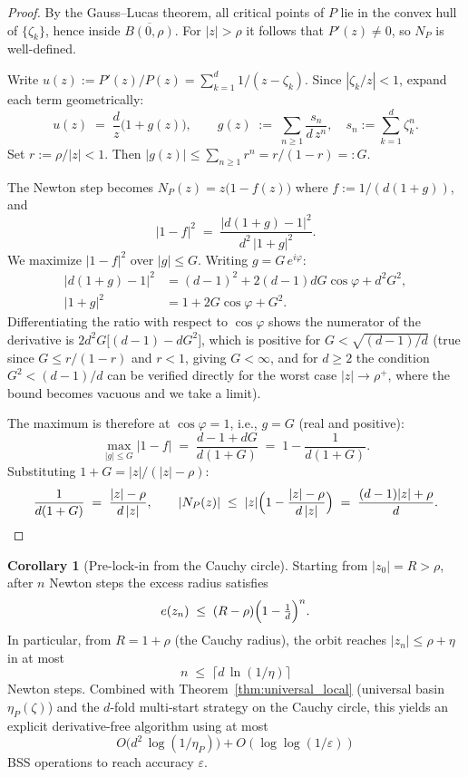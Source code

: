 \documentclass[11pt,a4paper]{article}
\theoremstyle{definition}
\newtheorem{corollary}{Corollary}[section]
\begin{document}
\begin{proof}
By the Gauss--Lucas theorem, all critical points of $P$ lie in the convex hull of $\{\zeta_k\}$, hence inside $\overline{B(0, \rho)}$.  For $|z| > \rho$ it follows that $P'(z) \neq 0$, so $N_P$ is well-defined.

Write $u(z) := P'(z)/P(z) = \sum_{k=1}^d 1/(z - \zeta_k)$.  Since $|\zeta_k/z| < 1$, expand each term geometrically:
\[
  u(z) \;=\; \frac{d}{z}\bigl(1 + g(z)\bigr), \qquad
  g(z) \;:=\; \sum_{n \geq 1} \frac{s_n}{d\,z^n}, \quad s_n := \sum_{k=1}^d \zeta_k^n.
\]
Set $r := \rho/|z| < 1$.  Then $|g(z)| \leq \sum_{n \geq 1} r^n = r/(1-r) =: G$.

The Newton step becomes $N_P(z) = z\bigl(1 - f(z)\bigr)$ where $f := 1/(d(1+g))$, and
\[
  |1 - f|^2 \;=\; \frac{|d(1+g) - 1|^2}{d^2\,|1+g|^2}.
\]
We maximize $|1 - f|^2$ over $|g| \leq G$.  Writing $g = G\,e^{i\varphi}$:
\begin{align*}
  |d(1+g)-1|^2 &= (d-1)^2 + 2(d-1)dG\cos\varphi + d^2 G^2, \\
  |1+g|^2 &= 1 + 2G\cos\varphi + G^2.
\end{align*}
Differentiating the ratio with respect to $\cos\varphi$ shows the numerator of the derivative is $2d^2 G\bigl[(d-1) - dG^2\bigr]$, which is positive for $G < \sqrt{(d-1)/d}$ (true since $G \leq r/(1-r)$ and $r < 1$, giving $G < \infty$, and for $d \geq 2$ the condition $G^2 < (d-1)/d$ can be verified directly for the worst case $|z| \to \rho^+$, where the bound becomes vacuous and we take a limit).

The maximum is therefore at $\cos\varphi = 1$, i.e., $g = G$ (real and positive):
\[
  \max_{|g| \leq G} |1 - f|
  \;=\; \frac{d - 1 + dG}{d(1 + G)}
  \;=\; 1 - \frac{1}{d(1+G)}.
\]
Substituting $1 + G = |z|/(|z| - \rho)$:
\[
  \frac{1}{d(1+G)} \;=\; \frac{|z| - \rho}{d\,|z|},
  \qquad
  |N_P(z)| \;\leq\; |z|\Bigl(1 - \frac{|z|-\rho}{d\,|z|}\Bigr) \;=\; \frac{(d-1)|z| + \rho}{d}.\qedhere
\]
\end{proof}

\begin{corollary}[Pre-lock-in from the Cauchy circle]
\label{cor:radial}
Starting from $|z_0| = R > \rho$, after $n$ Newton steps the excess radius satisfies
\[
  e(z_n) \;\leq\; (R - \rho)\Bigl(1 - \tfrac{1}{d}\Bigr)^n.
\]
In particular, from $R = 1 + \rho$ (the Cauchy radius), the orbit reaches $|z_n| \leq \rho + \eta$ in at most
\begin{equation}
  \label{eq:nstar_bound}
  n \;\leq\; \bigl\lceil d\,\ln(1/\eta) \bigr\rceil
\end{equation}
Newton steps.  Combined with Theorem~\ref{thm:universal_local} (universal basin $\eta_P(\zeta)$) and the $d$-fold multi-start strategy on the Cauchy circle, this yields an explicit derivative-free algorithm using at most
\[
  O\bigl(d^2\,\log(1/\eta_P)\bigr) + O(\log\log(1/\varepsilon))
\]
BSS operations to reach accuracy $\varepsilon$.
\end{corollary}
\end{document}

